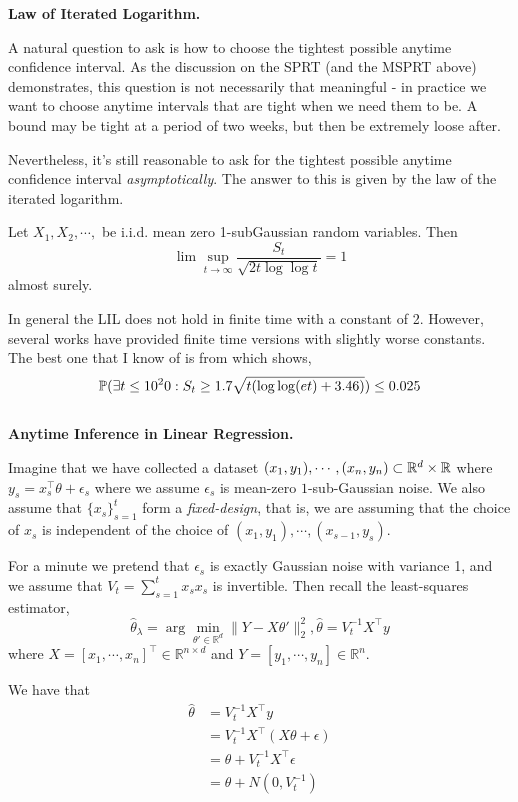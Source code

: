 \noindent\textbf{Law of Iterated Logarithm.}

A natural question to ask is how to choose the tightest possible anytime confidence interval. As the discussion on the SPRT (and the MSPRT above) demonstrates, this question is not necessarily that meaningful - in practice we want to choose anytime intervals that are tight when we need them to be. A bound may be tight at a period of two weeks, but then be extremely loose after.  

Nevertheless, it's still reasonable to ask for the tightest possible anytime confidence interval \textit{asymptotically}. The answer to this is given by the law of the iterated logarithm.

\begin{theorem}
    Let $X_1, X_2, \cdots, $ be i.i.d. mean zero 1-subGaussian random variables. Then \[\lim\sup_{t\rightarrow \infty} \frac{S_t}{\sqrt{2t\log\log t}} = 1\] almost surely.
\end{theorem}

In general the LIL does not hold in finite time with a constant of 2. However, several works have provided finite time versions with slightly worse constants. The best one that I know of is from \cite{howard2021time} which shows,
\[\P(\exists t\leq 10^20: S_t\geq 1.7\sqrt{t(\log\log(e t) + 3.46)})\leq 0.025\]\\


\noindent \textbf{Anytime Inference in Linear Regression.} 

Imagine that we have collected a dataset $(x_1, y_1), \cdots, (x_n, y_n) \subset \mathbb{R}^d \times \mb{R}$ where $y_s = x_s^{\top}\theta + \epsilon_s$ where we assume $\epsilon_s$ is mean-zero $1$-sub-Gaussian noise. We also assume that $\{x_s\}_{s=1}^t$ form a \textit{fixed-design}, that is, we are assuming that the choice of $x_s$ is independent of the choice of $(x_1, y_1), \cdots, (x_{s-1}, y_s)$. 

For a minute we pretend that $\epsilon_s$ is exactly Gaussian noise with variance 1, and we assume that $V_t = \sum_{s=1}^t x_s x_s$ is invertible. Then recall the least-squares estimator,
\[\hat\theta_{\lambda} = \arg\min_{\theta' \in \mathbb{R}^d} \|Y - X\theta'\|^2_2, \hat{\theta} = V_t^{-1} X^{\top} y\]
where $X = [x_1, \cdots, x_n]^{\top} \in \mathbb{R}^{n\times d}$ and $Y = [y_1, \cdots, y_n]\in\mathbb{R}^n$. 

We have that 
\begin{align*}
    \hat{\theta}
    &= V_t^{-1} X^{\top} y\\
    &= V_t^{-1} X^{\top} ( X\theta + \epsilon)\\
    &= \theta + V_t^{-1} X^{\top}\epsilon\\
    &= \theta + N(0, V_t^{-1})
\end{align*}

